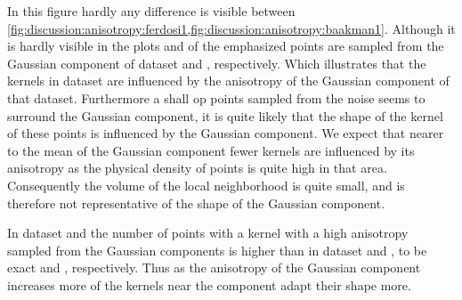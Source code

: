 				In this figure hardly any difference is visible between \cref{fig:discussion:anisotropy:ferdosi1,fig:discussion:anisotropy:baakman1}. 
					Although it is hardly visible in the plots  and  of the emphasized points are sampled from the Gaussian component of dataset \ferdosiOne and \baakmanOne, respectively. Which illustrates that the kernels in dataset \baakmanOne are influenced by the anisotropy of the Gaussian component of that dataset.
					Furthermore a shall op points sampled from the noise seems to surround the Gaussian component, it is quite likely that the shape of the kernel of these points is influenced by the Gaussian component. 
					We expect that nearer to the mean of the Gaussian component fewer kernels are influenced by its anisotropy as the physical density of points is quite high in that area. Consequently the volume of the local neighborhood is quite small, and is therefore not representative of the shape of the Gaussian component. 

				In dataset \baakmanFour and \baakmanFive the number of points with a kernel with a high anisotropy sampled from the Gaussian components is higher than in dataset \ferdosiOne and \baakmanOne, to be exact  and , respectively. Thus as the anisotropy of the Gaussian component increases more of the kernels near the component adapt their shape more. 
		
